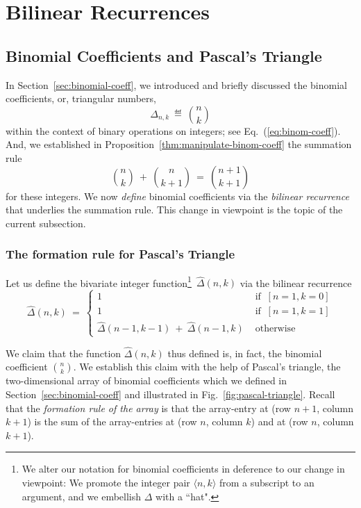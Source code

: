 \section{Bilinear Recurrences}
\label{sec:bilinear-recurrences}

\subsection{Binomial Coefficients and Pascal's Triangle}
\label{sec:binomial-coeff+Pascal}

 
In Section~\ref{sec:binomial-coeff}, we introduced and briefly discussed the binomial coefficients, or, triangular numbers, 
\[ \Delta_{n,k} \ \eqdef \ {n \choose k} \]
within the context of binary operations on integers; see Eq.~(\ref{eq:binom-coeff}).  And, we established in Proposition~\ref{thm:manipulate-binom-coeff} the summation rule
\[
{n \choose k} \ + \ {n \choose {k+1}} \ = \ {{n+1} \choose {k+1}}
\]
for these integers.  We now {\em define} binomial coefficients via the {\em bilinear recurrence} that underlies the summation rule.  This change in viewpoint is the topic of the current subsection.

\subsubsection{The formation rule for Pascal's Triangle}
\label{sec:Pascal-formation}

Let us define the bivariate integer function\footnote{We alter our notation for binomial coefficients in deference to our change in viewpoint: We promote the integer pair $\langle n,k \rangle$ from a subscript to an argument, and we embellish $\Delta$ with a ``hat".}~$\hat{\Delta}(n,k)$ via the bilinear recurrence
\begin{equation}
\label{eq:binom-coeff-recurrence}
\hat{\Delta}(n,k) \ = \ 
\left\{
\begin{array}{cl}
1  & \mbox{ if } \ [n=1, k=0] \\
1  & \mbox{ if } \ [n=1, k=1] \\
\hat{\Delta}(n-1, k-1) \ + \  \hat{\Delta}(n-1,k) & \mbox{ otherwise}
\end{array}
\right.
\end{equation}

\smallskip

We claim that the function $\hat{\Delta}(n,k)$ thus defined is, in fact, the binomial coefficient $\displaystyle {n \choose k}$.  We establish this claim with the help of Pascal's triangle, the two-dimensional array of binomial coefficients which we defined in Section~\ref{sec:binomial-coeff} and illustrated in Fig.~\ref{fig:pascal-triangle}.  Recall that the {\em formation rule of the array} is that the array-entry at (row $n+1$, column $k+1$) is the sum of the array-entries at (row $n$, column $k$) and at (row $n$, column $k+1$).

